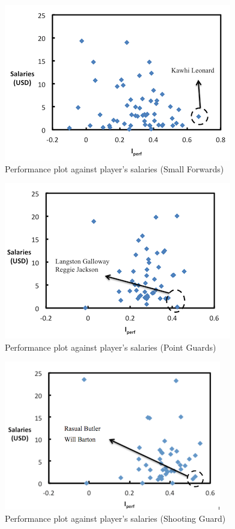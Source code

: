 \documentclass{acm_proc_article-sp}
\begin{document}
\begin{figure}[!htb]
\centering
\includegraphics{Fig-16.png}
\caption{Performance plot against player's salaries (Small Forwards)}
\end{figure}

\begin{figure}[!htb]
\centering
\includegraphics{Fig-17.png}
\caption{Performance plot against player's salaries (Point Guards)}
\end{figure}

\begin{figure}[!htb]
\centering
\includegraphics{Fig-18.png}
\caption{Performance plot against player's salaries (Shooting Guard)}
\end{figure}
\end{document}
